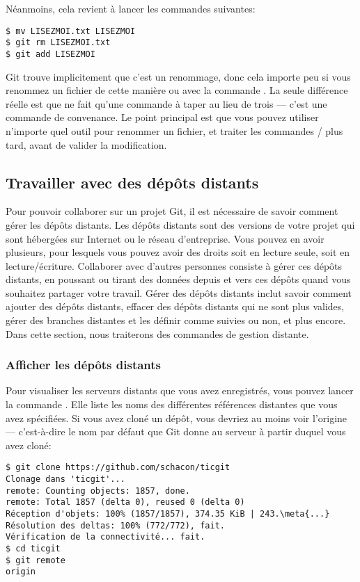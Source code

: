 Néanmoins, cela revient à lancer les commandes suivantes:
\begin{Schunk}
\begin{Verbatim}
$ mv LISEZMOI.txt LISEZMOI
$ git rm LISEZMOI.txt
$ git add LISEZMOI
\end{Verbatim}
\end{Schunk}

Git trouve implicitement que c'est un renommage, donc cela importe peu si vous renommez un fichier de cette manière ou avec la commande .
La seule différence réelle est que  ne fait qu'une commande à taper au lieu de trois --- c'est une commande de convenance.
Le point principal est que vous pouvez utiliser n'importe quel outil pour renommer un fichier, et traiter les commandes / plus tard, avant de valider la modification.

\subsection{Travailler avec des dépôts distants}
\label{sec:git:remote_repos}

Pour pouvoir collaborer sur un projet Git, il est nécessaire de savoir comment gérer les dépôts distants.
Les dépôts distants sont des versions de votre projet qui sont hébergées sur Internet ou le réseau d'entreprise.
Vous pouvez en avoir plusieurs, pour lesquels vous pouvez avoir des droits soit en lecture seule, soit en lecture/écriture.
Collaborer avec d'autres personnes consiste à gérer ces dépôts distants, en poussant ou tirant des données depuis et vers ces dépôts quand vous souhaitez partager votre travail.
Gérer des dépôts distants inclut savoir comment ajouter des dépôts distants, effacer des dépôts distants qui ne sont plus valides, gérer des branches distantes et les définir comme suivies ou non, et plus encore.
Dans cette section, nous traiterons des commandes de gestion distante.

\subsubsection{Afficher les dépôts distants}

Pour visualiser les serveurs distants que vous avez enregistrés, vous pouvez lancer la commande .
Elle liste les noms des différentes références distantes que vous avez spécifiées.
Si vous avez cloné un dépôt, vous devriez au moins voir l'origine  --- c'est-à-dire le nom par défaut que Git donne au serveur à partir duquel vous avez cloné:
\begin{Schunk}
\begin{Verbatim}[commandchars=\\\{\}]
$ git clone https://github.com/schacon/ticgit
Clonage dans 'ticgit'...
remote: Counting objects: 1857, done.
remote: Total 1857 (delta 0), reused 0 (delta 0)
Réception d'objets: 100% (1857/1857), 374.35 KiB | 243.\meta{...}
Résolution des deltas: 100% (772/772), fait.
Vérification de la connectivité... fait.
$ cd ticgit
$ git remote
origin
\end{Verbatim}
\end{Schunk}

